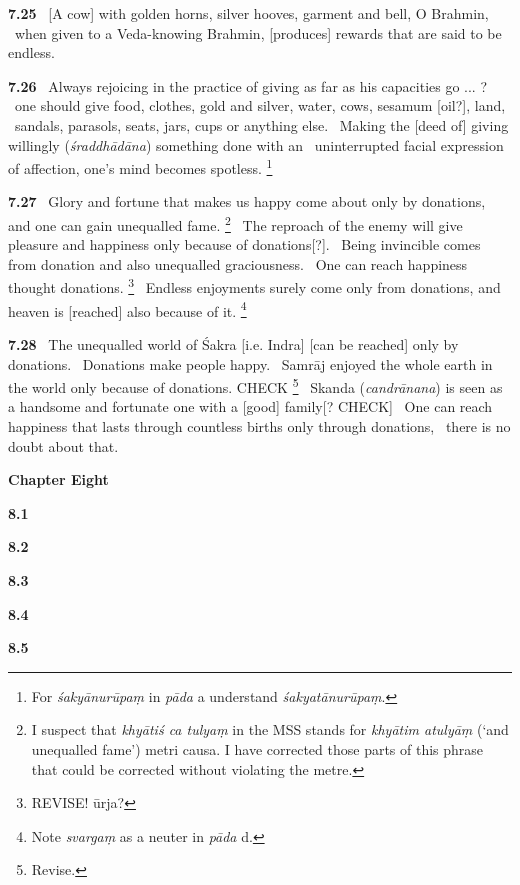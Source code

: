 \documentclass{article}
\newcommand{\skt}[1]{\textit{#1}}
\begin{document}
\textbf{7.25}%
\ [A cow] with golden horns, silver hooves, garment and bell, O Brahmin,%
\ when given to a Veda-knowing Brahmin, [produces] rewards that are said to be endless.%


\textbf{7.26}%
\ Always rejoicing in the practice of giving as far as his capacities go ... ?%
\ one should give food, clothes, gold and silver, water, cows, sesamum [oil?], land,%
\ sandals, parasols, seats, jars, cups or anything else.%
\ Making the [deed of] giving willingly (\skt{śraddhādāna}) something done with an%
\                  uninterrupted facial expression of affection, one's mind becomes spotless.%
\footnote{For \skt{śakyānurūpaṃ} in \skt{pāda} a understand \skt{śakyatānurūpaṃ}. }%


\textbf{7.27}%
\ Glory and fortune that makes us happy come about only by donations, and one can gain unequalled fame.%
\footnote{I suspect that \skt{khyātiś ca tulyaṃ} in the MSS stands for \skt{khyātim atulyāṃ} (`and unequalled fame')                 metri causa. I have corrected those parts of this phrase that could be                                 corrected without violating the metre. }%
\ The reproach of the enemy will give pleasure and happiness only because of donations[?].%
\ Being invincible comes from donation and also unequalled graciousness.%
\                 One can reach happiness thought donations.%
\footnote{REVISE! ūrja? }%
\ Endless enjoyments surely come only from donations, and heaven is [reached] also because of it.%
\footnote{Note \skt{svargaṃ} as a neuter in \skt{pāda} d. }%


\textbf{7.28}%
\ The unequalled world of Śakra [i.e. Indra] [can be reached] only by donations.%
\                                 Donations make people happy.%
\ Samrāj enjoyed the whole earth in the world only because of donations. CHECK%
\footnote{Revise. }%
\ Skanda (\skt{candrānana}) is seen as a handsome and fortunate one with a [good] family[? CHECK]%
\ One can reach happiness that lasts through countless births only through donations,%
\                                                 there is no doubt about that.%
\vfill\pagebreak\begin{center}{\large\textbf{ Chapter Eight
}}\end{center}


\textbf{8.1}%


\textbf{8.2}%


\textbf{8.3}%


\textbf{8.4}%


\textbf{8.5}%
\end{document}
